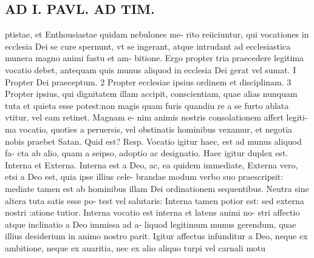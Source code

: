 \documentclass{article}
\begin{document}
\begin{pages}
\section*{AD I. PAVL. AD TIM. }
\marginpar{[ p.3*f. ]}\pstart ptistae, et Enthousiastae quidam nebulones me- rito reiiciuntur, qui vocationes in ecclesia Dei se cure spernunt, vt se ingerant, atque intrudant ad ecclesiastica munera magno animi fastu et am- bitione. Ergo propter tria praecedere legitima vocatio debet, antequam quis munus aliquod in ecclesia Dei gerat vel sumat. I Propter Dei praeceptum. 2 Propter ecclesiae ipsius ordinem et disciplinam. 3 Propter ipsius, qui dignitatem illam accipit, conscientiam, quae alias nunquam tuta et quieta esse potest:non magis quam furis quandiu re a se furto ablata vtitur, vel eam retinet. Magnam e- nim animis nostris consolationem affert legiti- ma vocatio, quoties a peruersis, vel obstinatis hominibus vexamur, et negotia nobis praebet Satan. Quid est? Resp. Vocatio igitur haec, est ad munus aliquod fa- cta ab alio, quam a seipso, adoptio ac designatio. Haec igitur duplex est. Interna et Externa. Interna est a Deo, ac, ea quidem immediate, Externa vero, etsi a Deo est, quia ipse illius cele- brandae modum verbo suo praescripsit: mediate tamen est ab hominibus illam Dei ordinationem sequentibus. Neutra sine altera tuta satis esse po- test vel salutaris: Interna tamen potior est: sed externa nostri :atione tutior. Interna vocatio est interna et latens animi no- stri affectio atque inclinatio a Deo immissa ad a- liquod legitimum munus gerendum, quae illius desiderium in animo nostro parit. Igitur affectus infunditur a Deo, neque ex ambitione, neque ex auaritia, nec ex alio aliquo turpi vel carnali motu  \pend

\end{pages}
\end{document}
